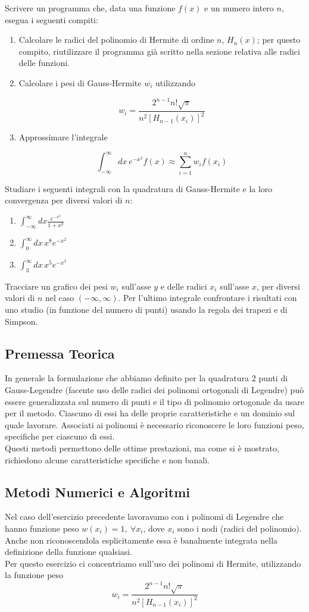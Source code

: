 Scrivere un programma che, data una funzione $f(x)$ e un numero intero $n$, esegua i seguenti compiti:
\begin{enumerate}
\item Calcolare le radici del polinomio di Hermite di ordine $n$, $H_n(x)$; per questo compito, riutilizzare il programma già scritto nella sezione relativa alle radici delle funzioni.
\item Calcolare i pesi di Gauss-Hermite $w_i$ utilizzando


$$w_i = \frac{2^{n-1} n! \sqrt{\pi}}{n^2 [H_{n-1}(x_i)]^2}$$


\item Approssimare l'integrale


$$\int_{-\infty}^{\infty} dx \, e^{-x^2} f(x) \approx \sum_{i=1}^{n} w_i f(x_i)$$


\end{enumerate}
Studiare i seguenti integrali con la quadratura di Gauss-Hermite e la loro convergenza per diversi valori di $n$:
\begin{enumerate}
\item $\int_{-\infty}^{\infty} dx \frac{e^{-x^2}}{1+x^2}$
\item $\int_{0}^{\infty} dx \, x^8 e^{-x^2}$
\item $\int_{3}^{\infty} dx \, x^5 e^{-x^2}$
\end{enumerate}
Tracciare un grafico dei pesi $w_i$ sull'asse $y$ e delle radici $x_i$ sull'asse $x$, per diversi valori di $n$ nel caso $(-\infty, \infty)$. Per l'ultimo integrale confrontare i risultati con uno studio (in funzione del numero di punti) usando la regola dei trapezi e di Simpson.

\subsection{Premessa Teorica}
In generale la formulazione che abbiamo definito per la quadratura 2 punti di Gauss-Legendre (facente uso delle radici dei polinomi ortogonali di Legendre) può essere generalizzata sul numero di punti e il tipo di polinomio ortogonale da usare per il metodo. Ciascuno di essi ha delle proprie caratteristiche e un dominio sul quale lavorare. Associati ai polinomi è necessario riconoscere le loro funzioni peso, specifiche per ciascuno di essi.\\
Questi metodi permettono delle ottime prestazioni, ma come si è mostrato, richiedono alcune caratteristiche specifiche e non banali.


\subsection{Metodi Numerici e Algoritmi}
Nel caso dell'esercizio precedente lavoravamo con i polinomi di Legendre che hanno funzione peso $w(x_i) =1,\  \forall x_i$, dove $x_i$ sono i nodi (radici del polinomio). Anche non riconoscendola esplicitamente essa è banalmente integrata nella definizione della funzione qualsiasi.\\
Per questo esercizio ci concentriamo sull'uso dei polinomi di Hermite, utilizzando la funzione peso
$$w_i = \frac{2^{n-1} n! \sqrt{\pi}}{n^2 [H_{n-1}(x_i)]^2}$$

